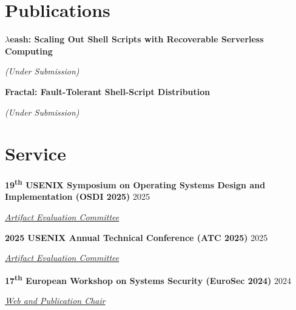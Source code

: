 \documentclass[margin,12pt]{resume}
\newcommand{\cvName}{Nikos Pagonas}
\newcommand{\subsectionVSpace}{\vspace{3.5ex}\xspace}
\newcommand{\sectionVSpace}{\vspace{1ex}\xspace} %
\newcommand{\sectionVSpaceCorrection}{\vspace{-3.5ex}} %
\newcommand{\header}[1]{\textbf{#1}\xspace}
\newcommand{\authors}[1]{#1\xspace}
\newcommand{\equalContributionNote}{(*equal contribution)\xspace}
\newcommand{\me}{\textbf{\cvName}\xspace}
\newcommand{\ordinal}[1]{\textsuperscript{#1}\xspace}
\newcommand{\paperTitle}[1]{\header{#1}\xspace}
\newcommand{\role}[1]{\textit{#1}\xspace}
\newcommand{\service}[1]{\header{#1}\xspace}
\newcommand{\underSubmission}{\textit{(Under Submission)}\xspace}
\newcommand{\venue}[1]{\textit{#1}\xspace}
\newenvironment{rSubsection}{}{\par\subsectionVSpace}
\newenvironment{rSection}[1]{\sectionVSpaceCorrection\section{#1}\xspace}{\sectionVSpace\par}
\begin{document}
\begin{resume}
\begin{rSection}{Publications}
        \begin{rSubsection}
            \paperTitle{\( \lambda \)eash: Scaling Out Shell Scripts with Recoverable Serverless Computing}

            \underSubmission


        \end{rSubsection}

        \begin{rSubsection}
            \paperTitle{Fractal: Fault-Tolerant Shell-Script Distribution}

            \underSubmission


        \end{rSubsection}
    \end{rSection}

    \begin{rSection}{Service}
        \begin{rSubsection}
            \service{19\ordinal{th} USENIX Symposium on Operating Systems Design and Implementation (OSDI 2025)} \hfill 2025

            \role{\href{https://www.usenix.org/conference/atc25}{Artifact Evaluation Committee}}
        \end{rSubsection}

        \begin{rSubsection}
            \service{2025 USENIX Annual Technical Conference (ATC 2025)} \hfill 2025

            \role{\href{https://www.usenix.org/conference/osdi25}{Artifact Evaluation Committee}}
        \end{rSubsection}

        \begin{rSubsection}
            \service{17\ordinal{th} European Workshop on Systems Security (EuroSec 2024)} \hfill 2024

            \role{\href{https://secopera.eu/eurosec-2024/}{Web and Publication Chair}}
        \end{rSubsection}
    \end{rSection}


\end{resume}
\end{document}
